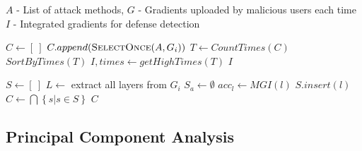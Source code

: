 \documentclass[conference]{IEEEtran}
\begin{document}
\begin{algorithm}
    \caption{Effective Feature Layers Identification}
    \label{alg:featureLayerSelection}
    \begin{algorithmic}[1]
        \Require $A$ - List of attack methods, $G$ - Gradients uploaded by malicious users each time
        \Ensure $I$ - Integrated gradients for defense detection

            \State $C \gets \left [ \ \right ] $
                \State $C.append( \Call{SelectOnce}{A, G_i})$
            \EndFor
            \State $T \gets CountTimes(C)$
            \State $SortByTimes(T)$
            \State $I, times \gets getHighTimes(T)$
            \State \Return $I$
        \EndFunction

            \State $S \gets \left [ \ \right ] $
                \State $L \gets$ extract all layers from $G_i$
                \State $S_a \gets \emptyset$
                    \State $acc_l \gets MGI(l)$
                        \State $S.insert(l)$
                    \EndIf
                \EndFor
            \State $C \gets \bigcap\left \{ s | s\in S  \right \}$
            \EndFor
            \State \Return $C$
        \EndFunction


        


    \end{algorithmic}
\end{algorithm}

\subsection{Principal Component Analysis}
\label{sec:method_PCA}
\end{document}

